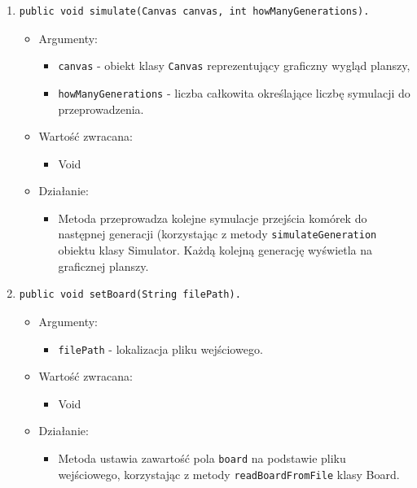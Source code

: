 \documentclass[a4paper,11pt, notitlepage ]{article}
\begin{document}
\begin{enumerate}
\item \begin{verbatim}public void simulate(Canvas canvas, int howManyGenerations). \end{verbatim}
\begin{itemize}
\item Argumenty:
\begin{itemize}
\item \verb+canvas+ - obiekt klasy \verb+Canvas+ reprezentujący graficzny wygląd planszy,
\item \verb+howManyGenerations+ - liczba całkowita określające liczbę symulacji do przeprowadzenia.
\end{itemize}
\item Wartość zwracana:
\begin{itemize}
\item Void
\end{itemize}
\item Działanie:
\begin{itemize}
\item Metoda przeprowadza kolejne symulacje przejścia komórek do następnej generacji (korzystając z metody \verb+simulateGeneration+ obiektu klasy Simulator. Każdą kolejną generację wyświetla na graficznej planszy.
\end{itemize}
\end{itemize}


\item \begin{verbatim}public void setBoard(String filePath). \end{verbatim}
\begin{itemize}
\item Argumenty:
\begin{itemize}
\item \verb+filePath+ - lokalizacja pliku wejściowego.
\end{itemize}
\item Wartość zwracana:
\begin{itemize}
\item Void
\end{itemize}
\item Działanie:
\begin{itemize}
\item Metoda ustawia zawartość pola \verb+board+ na podstawie pliku wejściowego, korzystając z metody \verb+readBoardFromFile+ klasy Board.
\end{itemize}
\end{itemize}


\end{enumerate}
\end{document}
